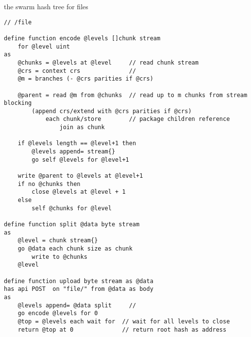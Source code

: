 \begin{definition}{the swarm hash tree for files}\label{def:swarm-hash}
\begin{lstlisting}[language=buzz1]
// /file

define function encode @levels []chunk stream 
    for @level uint
as
    @chunks = @levels at @level     // read chunk stream 
    @crs = context crs              // 
    @m = branches (- @crs parities if @crs) 
    
    @parent = read @m from @chunks  // read up to m chunks from stream blocking
        (append crs/extend with @crs parities if @crs)
            each chunk/store        // package children reference
                join as chunk
                
    if @levels length == @level+1 then
        @levels append= stream{}
        go self @levels for @level+1
    
    write @parent to @levels at @level+1 
    if no @chunks then
        close @levels at @level + 1
    else
        self @chunks for @level
            
define function split @data byte stream 
as
    @level = chunk stream{}
    go @data each chunk size as chunk 
        write to @chunks
    @level

define function upload byte stream as @data
has api POST  on "file/" from @data as body
as
    @levels append= @data split     // 
    go encode @levels for 0
    @top = @levels each wait for  // wait for all levels to close
    return @top at 0              // return root hash as address        
\end{lstlisting}
\end{definition}
                   

